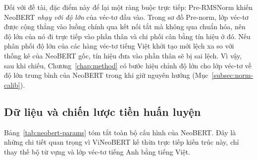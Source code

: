 Đối với đề tài, đặc điểm này để lại một ràng buộc trực tiếp: Pre-RMSNorm khiến NeoBERT
\textit{nhạy với độ lớn} của véc-tơ đầu vào. Trong sơ đồ Pre-norm, lớp véc-tơ được cộng
thẳng vào luồng chính qua kết nối tắt mà không qua chuẩn hóa, nên độ lớn của nó đi trực tiếp
vào phần thân và chi phối cân bằng tín hiệu ở đó. Nếu phân phối độ lớn của các hàng véc-tơ tiếng
Việt khởi tạo mới lệch xa so với thống kê của NeoBERT gốc, tín hiệu đưa vào phần thân sẽ bị
sai lệch. Vì vậy, sau khi chiếu, Chương~\ref{chap:method} có bước hiệu chỉnh độ
lớn cho lớp véc-tơ về độ lớn trung bình của NeoBERT trong khi giữ nguyên hướng
(Mục~\ref{subsec:norm-calib}).

\subsection{Dữ liệu và chiến lược tiền huấn luyện}
\label{subsec:neobert-pretrain}

Bảng~\ref{tab:neobert-params} tóm tắt toàn bộ cấu hình của NeoBERT. Đây là những chi tiết
quan trọng vì ViNeoBERT kế thừa trực tiếp kiến trúc này, chỉ thay thế bộ từ vựng và lớp
véc-tơ tiếng Anh bằng tiếng Việt.

